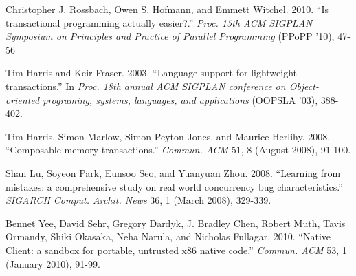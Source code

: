 \documentclass{sigplanconf}
\begin{document}
\begin{thebibliography}{}
  Christopher J. Rossbach, Owen S. Hofmann, and Emmett
  Witchel. 2010. ``Is transactional programming actually
  easier?.'' \emph{Proc. 15th ACM SIGPLAN Symposium on
    Principles and Practice of Parallel Programming} (PPoPP '10), 47-56


  Tim Harris and Keir Fraser. 2003. ``Language support for lightweight
  transactions.'' In \emph{Proc. 18th annual ACM SIGPLAN
    conference on Object-oriented programing, systems, languages, and
    applications} (OOPSLA '03), 388-402.

 Tim Harris, Simon Marlow, Simon Peyton Jones, and
  Maurice Herlihy. 2008. ``Composable memory transactions.''
  \emph{Commun. ACM} 51, 8 (August 2008), 91-100.


  Shan Lu, Soyeon Park, Eunsoo Seo, and Yuanyuan Zhou. 2008. ``Learning
  from mistakes: a comprehensive study on real world concurrency bug
  characteristics.'' \emph{SIGARCH Comput. Archit. News} 36, 1 (March 2008),
  329-339.

  Bennet Yee, David Sehr, Gregory Dardyk, J. Bradley Chen, Robert
  Muth, Tavis Ormandy, Shiki Okasaka, Neha Narula, and Nicholas
  Fullagar. 2010. ``Native Client: a sandbox for portable, untrusted x86
  native code.'' \emph{Commun. ACM} 53, 1 (January 2010), 91-99.



\end{thebibliography}
\end{document}
